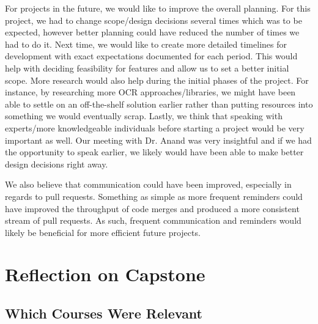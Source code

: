 \documentclass{article}
\begin{document}
For projects in the future, we would like to improve the overall planning. For this project, we had to change scope/design decisions several
times which was to be expected, however better planning could have reduced the number of
times we had to do it. Next time, we would like to create more detailed timelines for development with exact
expectations documented for each period. This would help with deciding feasibility for features and allow us
to set a better initial scope. More research would also help during the initial phases of the project.
For instance, by researching more OCR approaches/libraries, we might have been able to settle on an off-the-shelf solution
earlier rather than putting resources into something we would eventually scrap. Lastly, we think that speaking with experts/more
knowledgeable individuals before starting a project would be very important as well. Our meeting with Dr. Anand was very insightful
and if we had the opportunity to speak earlier, we likely would have been able to make better design decisions right away.

We also believe that communication could have been improved, especially in regards to pull requests.
Something as simple as more frequent reminders could have improved the throughput of code merges and produced a more
consistent stream of pull requests. As such, frequent communication and reminders would likely be beneficial for more efficient future
projects.

\section{Reflection on Capstone}


\subsection{Which Courses Were Relevant}

\end{document}

